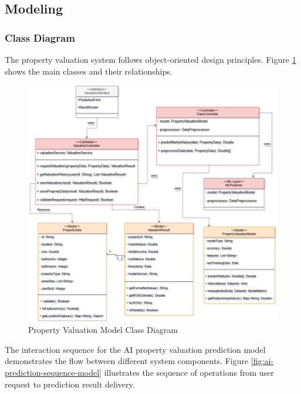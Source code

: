 \newpage

\subsection{Modeling}
\subsubsection{Class Diagram}
The property valuation system follows object-oriented design principles. Figure \ref{fig:valuation-class-diagram} shows the main classes and their relationships.

\begin{figure}[htbp]
    \centering
    \includegraphics[width=1\textwidth]{images/valuation_class_diagram.png}
    \caption{Property Valuation Model Class Diagram}
    \label{fig:valuation-class-diagram}
\end{figure}

\newpage
The interaction sequence for the AI property valuation prediction model demonstrates the flow between different system components. Figure \ref{fig:ai-prediction-sequence-model} illustrates the sequence of operations from user request to prediction result delivery.

